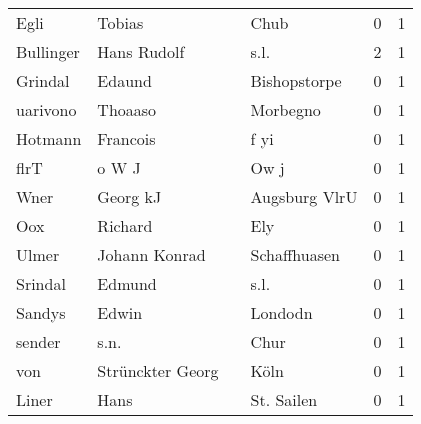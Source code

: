 \begin{center}
\begin{tiny}
\begin{longtabu}{llllrr}
                     Egli &                             Tobias &             &                                        Chub &          0 &         1 \\
                Bullinger &                        Hans Rudolf &             &                                        s.l. &          2 &         1 \\
                  Grindal &                             Edaund &             &                                Bishopstorpe &          0 &         1 \\
                 uarivono &                            Thoaaso &             &                                    Morbegno &          0 &         1 \\
                  Hotmann &                           Francois &             &                                        f yi &          0 &         1 \\
                     flrT &                              o W J &             &                                        Ow j &          0 &         1 \\
                     Wner &                           Georg kJ &             &                               Augsburg VlrU &          0 &         1 \\
                      Oox &                            Richard &             &                                         Ely &          0 &         1 \\
                    Ulmer &                      Johann Konrad &             &                                Schaffhuasen &          0 &         1 \\
                  Srindal &                             Edmund &             &                                        s.l. &          0 &         1 \\
                   Sandys &                              Edwin &             &                                     Londodn &          0 &         1 \\
                   sender &                               s.n. &             &                                        Chur &          0 &         1 \\
                      von &                   Strünckter Georg &             &                                        Köln &          0 &         1 \\
                    Liner &                               Hans &             &                                  St. Sailen &          0 &         1 \\

\end{longtabu}
\end{tiny}
\end{center}
